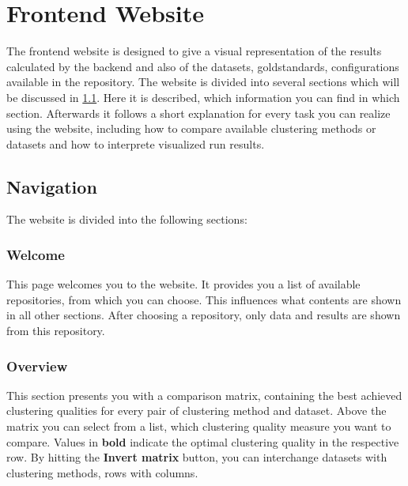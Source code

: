 
	\section{Frontend Website}\label{subsec_frontend_website}
	The frontend website is designed to give a visual representation of the results calculated by the backend and also of the datasets, goldstandards, configurations available in the repository. The website is divided into several sections which will be discussed in \ref{website_nav}. Here it is described, which information you can find in which section. Afterwards it follows a short explanation for every task you can realize using the website, including how to compare available clustering methods or datasets and how to interprete visualized run results.
	\subsection{Navigation}\label{website_nav}
	The website is divided into the following sections:
	\subsubsection{Welcome}
	This page welcomes you to the website. It provides you a list of available repositories, from which you can choose. This influences what contents are shown in all other sections. After choosing a repository, only data and results are shown from this repository.
	\subsubsection{Overview}
	This section presents you with a comparison matrix, containing the best achieved clustering qualities for every pair of clustering method and dataset. Above the matrix you can select from a list, which clustering quality measure you want to compare.
	Values in \textbf{bold} indicate the optimal clustering quality in the respective row. By hitting the \textbf{Invert matrix} button, you can interchange datasets with clustering methods, rows with columns.
